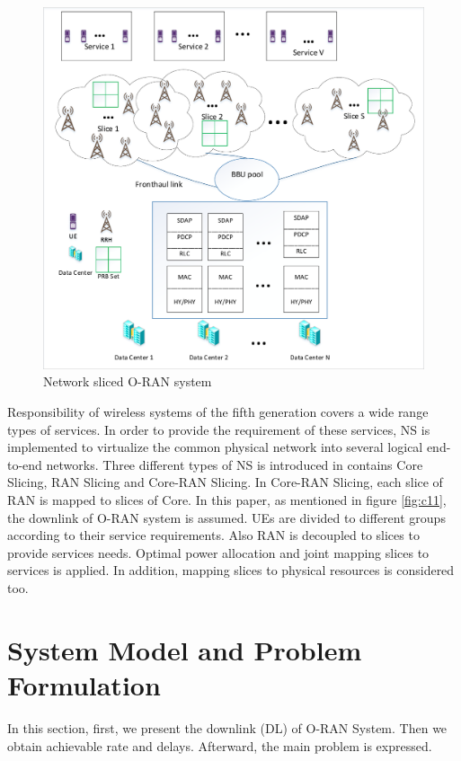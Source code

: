 \documentclass[conference]{IEEEtran}
\begin{document}
\begin{figure}[H]
  \centering
    \includegraphics[scale=0.55]{c2}
  \caption{Network sliced O-RAN system}
  \label{fig:c11}
\end{figure} 
Responsibility of wireless systems of the fifth generation covers a wide range types of services. In order to provide the requirement of these services, NS is implemented to virtualize the common physical network into several logical end-to-end networks. Three different types of NS is introduced in \cite{ns1} contains Core Slicing, RAN Slicing and Core-RAN Slicing. In Core-RAN Slicing, each slice of RAN is mapped to slices of Core.    
\newline
In this paper, as  mentioned in figure \eqref{fig:c11}, the downlink of O-RAN system is assumed. UEs are divided to different groups according to 
their service requirements. Also RAN is decoupled to slices to provide services needs. Optimal power allocation and joint mapping slices to services is applied. In addition, mapping slices to physical resources is considered too.
\section{System Model and Problem Formulation}
In this section, first, we present the downlink (DL) of O-RAN System. Then we obtain achievable rate and delays.
Afterward, the main problem is expressed.
\end{document}
